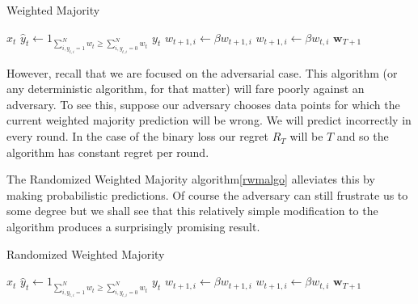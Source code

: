 \documentclass{article}
\begin{document}
\begin{algorithm}[H]
\caption{Weighted Majority}
\label{wmalgo}
\begin{algorithmic}[1]
\EndFor
{}
    \State {} $x_t$
    \State $\hat y_t \leftarrow 1_{\sum_{i, y_{t,i}=1}^N w_t \ge \sum_{i, y_{t,i}=0}^N w_t}$
    \State {} $y_t$
                \State $w_{t+1,i} \leftarrow \beta w_{t+1,i}$
            \Else
                \State $w_{t+1,i} \leftarrow \beta w_{t,i}$
            \EndIf
        \EndFor
    \EndIf
\EndFor
\State \Return $\textbf{w}_{T+1}$
\end{algorithmic}
\end{algorithm}

However, recall that we are focused on the adversarial case. This algorithm (or any deterministic algorithm, for that matter) will fare poorly against an adversary. To see this, suppose our adversary chooses data points for which the current weighted majority prediction will be wrong. We will predict incorrectly in every round. In the case of the binary loss our regret $R_T$ will be $T$ and so the algorithm has constant regret per round.

The Randomized Weighted Majority algorithm\autoref{rwmalgo} alleviates this by making probabilistic predictions. Of course the adversary can still frustrate us to some degree but we shall see that this relatively simple modification to the algorithm produces a surprisingly promising result.

\begin{algorithm}[H]
\caption{Randomized Weighted Majority}
\label{rwmalgo}
\begin{algorithmic}[1]
\EndFor
{}
    \State {} $x_t$
    \State $\hat y_t \leftarrow 1_{\sum_{i, y_{t,i}=1}^N w_t \ge \sum_{i, y_{t,i}=0}^N w_t}$
    \State {} $y_t$
                \State $w_{t+1,i} \leftarrow \beta w_{t+1,i}$
            \Else
                \State $w_{t+1,i} \leftarrow \beta w_{t,i}$
            \EndIf
        \EndFor
    \EndIf
\EndFor
\State \Return $\textbf{w}_{T+1}$
\end{algorithmic}
\end{algorithm}
\end{document}
